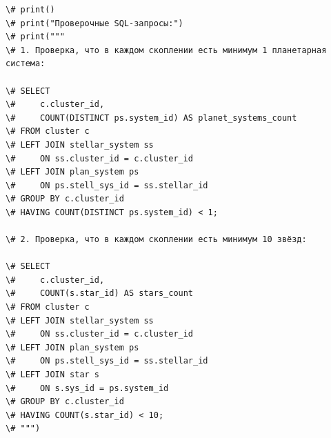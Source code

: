 \documentclass[14pt,a4paper]{extarticle}
\begin{document}
\begin{lstlisting}
\# print()
\# print("Проверочные SQL-запросы:")
\# print("""
\# 1. Проверка, что в каждом скоплении есть минимум 1 планетарная система:

\# SELECT 
\#     c.cluster_id,
\#     COUNT(DISTINCT ps.system_id) AS planet_systems_count
\# FROM cluster c
\# LEFT JOIN stellar_system ss 
\#     ON ss.cluster_id = c.cluster_id
\# LEFT JOIN plan_system ps 
\#     ON ps.stell_sys_id = ss.stellar_id
\# GROUP BY c.cluster_id
\# HAVING COUNT(DISTINCT ps.system_id) < 1;

\# 2. Проверка, что в каждом скоплении есть минимум 10 звёзд:

\# SELECT 
\#     c.cluster_id,
\#     COUNT(s.star_id) AS stars_count
\# FROM cluster c
\# LEFT JOIN stellar_system ss 
\#     ON ss.cluster_id = c.cluster_id
\# LEFT JOIN plan_system ps 
\#     ON ps.stell_sys_id = ss.stellar_id
\# LEFT JOIN star s 
\#     ON s.sys_id = ps.system_id
\# GROUP BY c.cluster_id
\# HAVING COUNT(s.star_id) < 10;
\# """)
\end{lstlisting}
\end{document}
